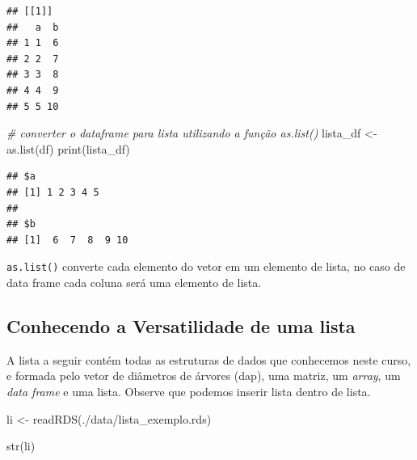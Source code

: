 \documentclass[
]{article}
\newenvironment{Shaded}{\begin{snugshade}}{\end{snugshade}}
\newcommand{\CommentTok}[1]{\textcolor[rgb]{0.56,0.35,0.01}{\textit{#1}}}
\newcommand{\FunctionTok}[1]{\textcolor[rgb]{0.00,0.00,0.00}{#1}}
\newcommand{\NormalTok}[1]{#1}
\newcommand{\OtherTok}[1]{\textcolor[rgb]{0.56,0.35,0.01}{#1}}
\newcommand{\StringTok}[1]{\textcolor[rgb]{0.31,0.60,0.02}{#1}}
\begin{document}
\begin{verbatim}
## [[1]]
##   a  b
## 1 1  6
## 2 2  7
## 3 3  8
## 4 4  9
## 5 5 10
\end{verbatim}

\begin{Shaded}
\begin{Highlighting}[]
\CommentTok{\# converter o dataframe para lista utilizando a função as.list()}
\NormalTok{lista\_df }\OtherTok{\textless{}{-}} \FunctionTok{as.list}\NormalTok{(df)}
\FunctionTok{print}\NormalTok{(lista\_df)}
\end{Highlighting}
\end{Shaded}

\begin{verbatim}
## $a
## [1] 1 2 3 4 5
## 
## $b
## [1]  6  7  8  9 10
\end{verbatim}

\texttt{as.list()} converte cada elemento do vetor em um elemento de
lista, no caso de data frame cada coluna será uma elemento de lista.

\hypertarget{conhecendo-a-versatilidade-de-uma-lista}{%
\subsection{Conhecendo a Versatilidade de uma
lista}\label{conhecendo-a-versatilidade-de-uma-lista}}

A lista a seguir contém todas as estruturas de dados que conhecemos
neste curso, e formada pelo vetor de diâmetros de árvores (dap), uma
matriz, um \emph{array}, um \emph{data frame} e uma lista. Observe que
podemos inserir lista dentro de lista.

\begin{Shaded}
\begin{Highlighting}[]
\NormalTok{li }\OtherTok{\textless{}{-}} \FunctionTok{readRDS}\NormalTok{(}\StringTok{\textquotesingle{}./data/lista\_exemplo.rds\textquotesingle{}}\NormalTok{)}

\FunctionTok{str}\NormalTok{(li)}
\end{Highlighting}
\end{Shaded}
\end{document}
